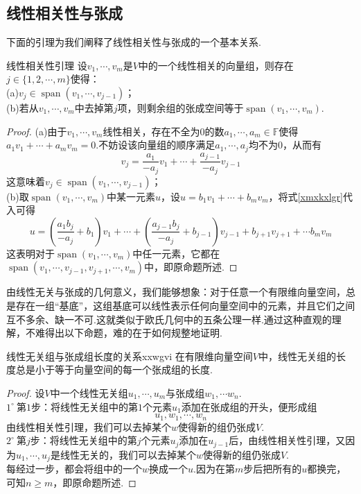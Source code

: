 \documentclass[lang=cn, zihao=5]{elegantbook}
\newcommand{\ssb}[1]{\left( #1 \right)}
\newcommand{\F}{\mathbb{F}}
\newcommand{\buzhou}[1]{$#1^{\circ} \ $}
\DeclareMathOperator{\spn}{span}
\begin{document}
\subsection{线性相关性与张成}

下面的引理为我们阐释了线性相关性与张成的一个基本关系.

\begin{proposition}{线性相关性引理}
	设$v_1, \cdots ,v_m$是$V$中的一个线性相关的向量组，则存在$j \in \{ 1,2, \cdots ,m \}$使得： \\
	(a)$v_j \in \spn (v_1, \cdots , v_{j-1})$； \\
	(b)若从$v_1, \cdots ,v_m$中去掉第$j$项，则剩余组的张成空间等于$\spn (v_1, \cdots ,v_m)$.
\end{proposition}
\begin{proof}
	(a)由于$v_1, \cdots ,v_m$线性相关，存在不全为$0$的数$a_1, \cdots ,a_m \in \F$使得$a_1v_1 + \cdots + a_mv_m = 0$.不妨设该向量组的顺序满足$a_1, \cdots ,a_j$均不为$0$，从而有
	\begin{equation}
		v_j = \frac{a_1}{-a_j} v_1 + \cdots + \frac{a_{j-1}}{-a_j} v_{j-1} \label{xmxkxlgr}
	\end{equation}
	这意味着$v_j \in \spn (v_1, \cdots , v_{j-1})$； \\
	(b)取$\spn (v_1, \cdots ,v_m)$中某一元素$u$，设$u=b_1v_1 + \cdots + b_mv_m$，将式\ref{xmxkxlgr}代入可得
	$$u = \ssb{\frac{a_1b_j}{-a_j}+b_1}v_1 + \cdots + \ssb{\frac{a_{j-1}b_j}{-a_j}+b_{j-1}}v_{j-1} + b_{j+1} v_{j+1} + \cdots b_mv_m$$
	这表明对于$\spn (v_1, \cdots ,v_m)$中任一元素，它都在$\spn (v_1, \cdots ,v_{j-1} , v_{j+1}, \cdots ,v_m)$中，即原命题所述.
\end{proof}

由线性无关与张成的几何意义，我们能够想象：对于任意一个有限维向量空间，总是存在一组“基底”，这组基底可以线性表示任何向量空间中的元素，并且它们之间互不多余、缺一不可.这就类似于欧氏几何中的五条公理一样.通过这种直观的理解，不难得出以下命题，难的在于如何规整地证明.

\begin{proposition}{线性无关组与张成组长度的关系}{xxwgvi}
	在有限维向量空间$V$中，线性无关组的长度总是小于等于向量空间的每一个张成组的长度.
\end{proposition}
\begin{proof}
	设$V$中一个线性无关组$u_1, \cdots ,u_m$与张成组$w_1, \cdots w_n$. \\
	\buzhou{1}第$1$步：将线性无关组中的第$1$个元素$u_1$添加在张成组的开头，便形成组$$u_1,w_1, \cdots ,w_n$$
	由线性相关性引理，我们可以去掉某个$w$使得新的组仍张成$V$. \\
	\buzhou{2}第$j$步：将线性无关组中的第$j$个元素$u_j$添加在$u_{j-1}$后，由线性相关性引理，又因为$u_1, \cdots ,u_j$是线性无关的，我们可以去掉某个$w$使得新的组仍张成$V$. \\
	每经过一步，都会将组中的一个$w$换成一个$u$.因为在第$m$步后把所有的$u$都换完，可知$n \geq m$，即原命题所述.
\end{proof}
\end{document}
